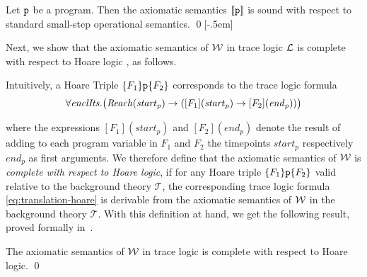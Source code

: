 \begin{theorem}
	Let $\texttt{p}$ be a program. Then the axiomatic semantics
	$\llbracket \texttt{p} \rrbracket$ is sound with respect to
	standard small-step operational semantics.
	\qed[-.5em]
\end{theorem}

Next, we show that the axiomatic semantics of $\mathcal{W}$ in trace
logic $\mathcal{L}$  is complete with respect to Hoare logic \cite{hoare1969axiomatic}, as follows.

Intuitively, a Hoare Triple $\{F_1\}\texttt{p}\{F_2\}$ corresponds to the trace logic formula
\begin{equation}\label{eq:translation-hoare}
\hspace*{-.75em}	\forall
\mathit{enclIts}. \big(\mathit{Reach}(\mathit{start}_{p}) \rightarrow
([F_1](\mathit{start}_p)\rightarrow [F_2](\mathit{end}_p))\big)\hspace*{-.75em}
\end{equation}

where the expressions $[F_1](\mathit{start}_p)$ and
$[F_2](\mathit{end}_p)$ denote the result of adding to each program
variable in $F_1$ and $F_2$ the timepoints $\mathit{start}_p$
respectively  $\mathit{end}_p$ as first arguments.
We therefore define that the axiomatic semantics of $\mathcal{W}$ is \emph{complete with respect to Hoare logic}, if for any Hoare triple $\{F_1\}\texttt{p}\{F_2\}$ valid relative to the background theory $\mathcal{T}$, the corresponding trace logic formula \eqref{eq:translation-hoare}	is derivable from the axiomatic semantics of $\mathcal{W}$ in the background theory $\mathcal{T}$.
With this definition at hand, we get the following result, proved
formally in~\cite{extendedversion}.%
\begin{theorem}
	The axiomatic semantics of $\mathcal{W}$  in trace logic is
	complete with respect to Hoare logic.
	\qed
\end{theorem}






